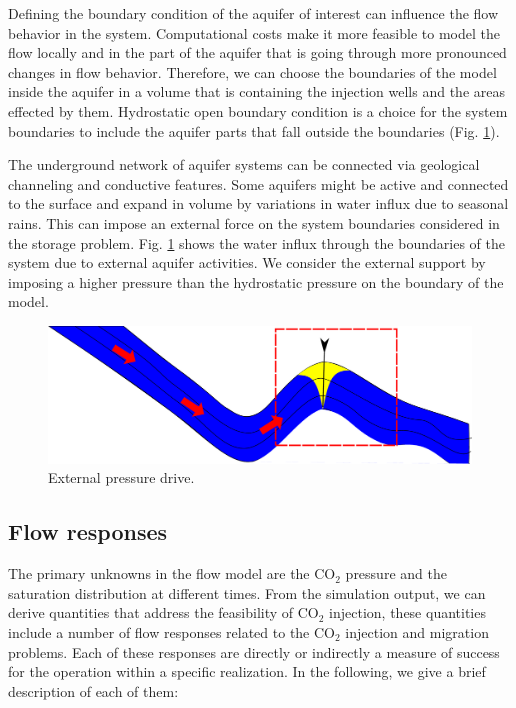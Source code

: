 Defining the boundary condition of the aquifer of interest can influence the
flow behavior in the system. Computational costs make it more feasible to model the flow locally and in the
part of the aquifer that is going through more pronounced changes in flow
behavior. Therefore, we can choose the boundaries of the model inside the aquifer
in a volume that is containing the injection wells and the areas effected by
them. Hydrostatic open boundary condition is a choice for the system boundaries
to include the aquifer parts that fall outside the boundaries (Fig.
\ref{fig:bkw}).

The underground network of aquifer systems can be connected via geological
channeling and conductive features. Some aquifers might be active and connected
to the surface and expand in volume by variations in water influx due to 
seasonal rains. This can impose an external force on the system boundaries
considered in the storage problem. Fig. \ref{fig:bkw} shows the water influx
through the boundaries of the system due to external aquifer activities. We
consider the external support by imposing a higher pressure than the hydrostatic
pressure on the boundary of the model.

\begin{figure}[thb]
  \centering
  \includegraphics[width=0.65 \linewidth]{./figurer/bkw} 
  \caption{External pressure drive.}
  \label{fig:bkw}
%
\end{figure}


\subsection{Flow responses}

The primary unknowns in the flow model are the $\mbox{CO}_2$ pressure
and the saturation distribution at different times. From the simulation
output, we can derive quantities that
address the feasibility of $\mbox{CO}_2$ injection,
these quantities include a number of flow responses related to the $\mbox{CO}_2$
injection and migration problems. Each of these responses are directly or
indirectly a measure of success for the operation within a specific realization.
In the following, we give a brief description of each of them:

